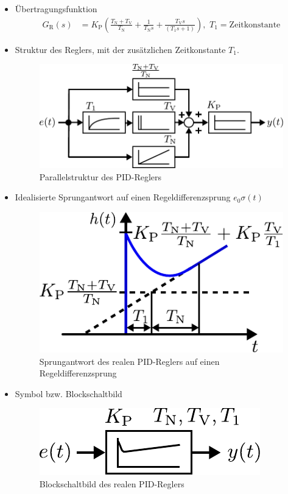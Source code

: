 \begin{itemize}
	\item Übertragungsfunktion
	\begin{equation*}
	\begin{aligned}
	G_{\text{R}}(s)&=K_{\text{P}}\left(\frac{T_{\text{N}}+T_{\text{V}}}{T_{\text{N}}}+\frac{1}{T_{\text{N}}s}+\frac{T_{\text{V}}s}{\left(T_{1}s+1\right)}\right),\,\, T_{\text{1}}=\text{Zeitkonstante}
	\end{aligned}
	\end{equation*}
	\item Struktur des Reglers, mit der zusätzlichen Zeitkonstante $T_{\text{1}}$.
	\begin{figure}[h]
		\centering
		\includegraphics[width=0.6\linewidth]{Abbildungen/Reglerentwurf/PDF/PIDReglerTechStruktur.pdf}
		\caption{Parallelstruktur des PID-Reglers}
	\end{figure}
	\item Idealisierte Sprungantwort auf einen Regeldifferenzsprung $e_{0}\sigma(t)$
	\begin{figure}[h]
		\centering
		\includegraphics[width=0.4\linewidth]{Abbildungen/Reglerentwurf/PDF/PIDReglerTechSprung.pdf}
		\caption{Sprungantwort des realen PID-Reglers auf einen Regeldifferenzsprung}
	\end{figure}
	\item Symbol bzw. Blockschaltbild
	\begin{figure}
		\centering
		\includegraphics[width=0.3\linewidth]{Abbildungen/Reglerentwurf/PDF/PIDReglerTechBlock.pdf}
		\caption{Blockschaltbild des realen PID-Reglers}
	\end{figure}
\end{itemize}
%
